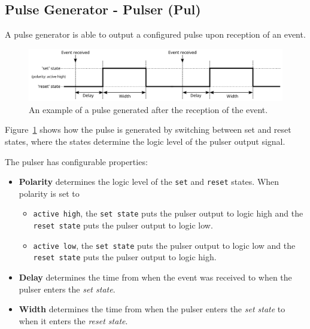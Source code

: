 \documentclass[12pt,a4paper]{article}
\begin{document}
\subsection{Pulse Generator - Pulser (Pul)}\label{sec:Pulser}
A pulse generator is able to output a configured pulse upon reception of an event.
\begin{figure}[H]
	\centering
	\includegraphics[width=\columnwidth]{./img/pulserGeneric}
	\caption{An example of a pulse generated after the reception of the event.}
	\label{fig:pulser_generic}
\end{figure}
Figure~\ref{fig:pulser_generic} shows how the pulse is generated by switching between set and reset states, where the states determine the logic level of the pulser output signal.

The pulser has configurable properties:
\begin{itemize}
	\item \textbf{Polarity} determines the logic level of the \texttt{set} and \texttt{reset} states. When polarity is set to
	\begin{itemize}
		\item \texttt{active high}, the \texttt{set state} puts the pulser output to logic high and the \texttt{reset state} puts the pulser output to logic low. 
		\item \texttt{active low}, the \texttt{set state} puts the pulser output to logic low and the \texttt{reset state} puts the pulser output to logic high.
	\end{itemize}
	\item  \textbf{Delay} determines the time from when the event was received to when the pulser enters the \textit{set state}.
	\item  \textbf{Width} determines the time from when the pulser enters the \textit{set state} to when it enters the \textit{reset state}.
\end{itemize}
\end{document}
